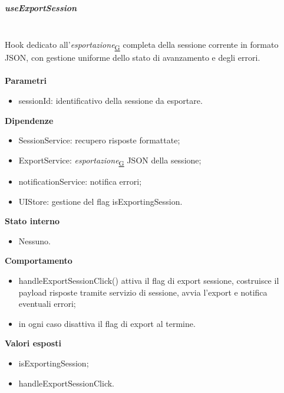 \documentclass[a4paper,12pt]{article}
\begin{document}
                \subparagraph{useExportSession}\mbox{}\\
                Hook dedicato all'\textit{esportazione}\textsubscript{\href{https://atlasteam9.github.io/Atlas/glossario.html\#Esportazione}{G}} completa della sessione corrente in formato JSON, con gestione uniforme dello stato di avanzamento e degli errori.\\\\
                \textbf{Parametri}
                \begin{itemize}
                    \item {\ttfamily sessionId}: identificativo della sessione da esportare.
                \end{itemize}
                \textbf{Dipendenze}
                \begin{itemize}
                    \item {\ttfamily SessionService}: recupero risposte formattate;
                    \item {\ttfamily ExportService}: \textit{esportazione}\textsubscript{\href{https://atlasteam9.github.io/Atlas/glossario.html\#Esportazione}{G}} JSON della sessione;
                    \item {\ttfamily notificationService}: notifica errori;
                    \item {\ttfamily UIStore}: gestione del flag {\ttfamily isExportingSession}.
                \end{itemize}
                \textbf{Stato interno}
                \begin{itemize}
                    \item Nessuno.
                \end{itemize}
                \textbf{Comportamento}
                \begin{itemize}
                    \item {\ttfamily handleExportSessionClick()} attiva il flag di export sessione, costruisce il payload risposte tramite servizio di sessione, avvia l'export e notifica eventuali errori;
                    \item in ogni caso disattiva il flag di export al termine.
                \end{itemize}
                \textbf{Valori esposti}
                \begin{itemize}
                    \item {\ttfamily isExportingSession};
                    \item {\ttfamily handleExportSessionClick}.
                \end{itemize}
                
\end{document}
